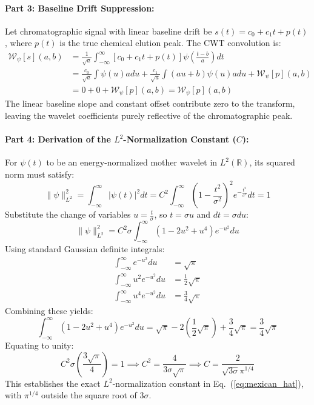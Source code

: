 \documentclass[11pt,twoside,openright]{book}
\begin{document}
\paragraph{Part 3: Baseline Drift Suppression:}
Let chromatographic signal with linear baseline drift be $s(t) = c_0 + c_1 t + p(t)$, where $p(t)$ is the true chemical elution peak.
The CWT convolution is:
\begin{align*}
\mathcal{W}_\psi[s](a, b) &= \frac{1}{\sqrt{a}} \int_{-\infty}^\infty \left[ c_0 + c_1 t + p(t) \right] \psi\left(\frac{t-b}{a}\right) dt \\
&= \frac{c_0}{\sqrt{a}} \int \psi(u) a du + \frac{c_1}{\sqrt{a}} \int (a u + b) \psi(u) a du + \mathcal{W}_\psi[p](a, b) \\
&= 0 + 0 + \mathcal{W}_\psi[p](a, b) = \mathcal{W}_\psi[p](a, b)
\end{align*}
The linear baseline slope and constant offset contribute zero to the transform, leaving the wavelet coefficients purely reflective of the chromatographic peak.

\paragraph{Part 4: Derivation of the $L^2$-Normalization Constant ($C$):}
For $\psi(t)$ to be an energy-normalized mother wavelet in $L^2(\mathbb{R})$, its squared norm must satisfy:
\begin{equation*}
\|\psi\|_{L^2}^2 = \int_{-\infty}^\infty |\psi(t)|^2 dt = C^2 \int_{-\infty}^\infty \left( 1 - \frac{t^2}{\sigma^2} \right)^2 e^{-\frac{t^2}{\sigma^2}} dt = 1
\end{equation*}
Substitute the change of variables $u = \frac{t}{\sigma}$, so $t = \sigma u$ and $dt = \sigma du$:
\begin{equation*}
\|\psi\|_{L^2}^2 = C^2 \sigma \int_{-\infty}^\infty \left( 1 - 2u^2 + u^4 \right) e^{-u^2} du
\end{equation*}
Using standard Gaussian definite integrals:
\begin{align*}
\int_{-\infty}^\infty e^{-u^2} du &= \sqrt{\pi} \\
\int_{-\infty}^\infty u^2 e^{-u^2} du &= \frac{1}{2}\sqrt{\pi} \\
\int_{-\infty}^\infty u^4 e^{-u^2} du &= \frac{3}{4}\sqrt{\pi}
\end{align*}
Combining these yields:
\begin{equation*}
\int_{-\infty}^\infty \left( 1 - 2u^2 + u^4 \right) e^{-u^2} du = \sqrt{\pi} - 2\left(\frac{1}{2}\sqrt{\pi}\right) + \frac{3}{4}\sqrt{\pi} = \frac{3}{4}\sqrt{\pi}
\end{equation*}
Equating to unity:
\begin{equation*}
C^2 \sigma \left( \frac{3\sqrt{\pi}}{4} \right) = 1 \implies C^2 = \frac{4}{3\sigma\sqrt{\pi}} \implies C = \frac{2}{\sqrt{3\sigma}\pi^{1/4}}
\end{equation*}
This establishes the exact $L^2$-normalization constant in Eq.~(\ref{eq:mexican_hat}), with $\pi^{1/4}$ outside the square root of $3\sigma$.
\end{document}
